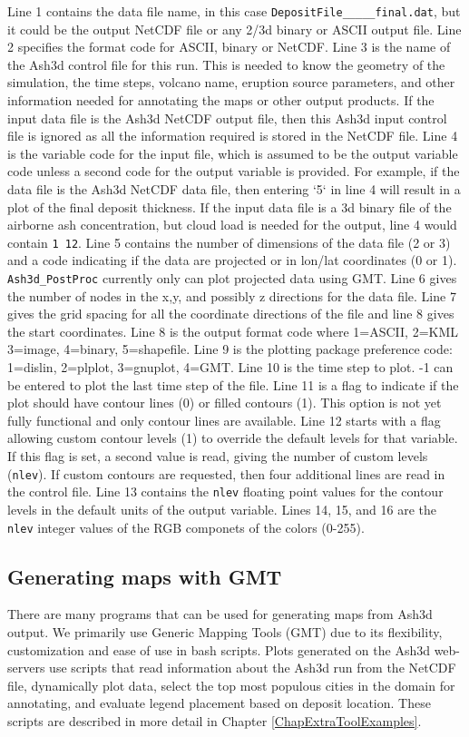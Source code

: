 Line 1 contains the data file name, in this case
\texttt{DepositFile\_\_\_\_\_final.dat}, but it could be
the output NetCDF file or any 2/3d binary or ASCII output file.
Line 2 specifies the format code for ASCII, binary or NetCDF.
Line 3 is the name of the Ash3d control file for this run. This is needed to know the geometry
of the simulation, the time steps, volcano name, eruption source parameters, and
other information needed for annotating the maps or other output products. If the
input data file is the Ash3d NetCDF output file, then this Ash3d input control file
is ignored as all the information required is stored in the NetCDF file.
Line 4 is the variable code for the input file, which is assumed to be the output
variable code unless a second code for the output variable is provided. For example, if
the data file is the Ash3d NetCDF data file, then entering `5` in line 4 will result
in a plot of the final deposit thickness. If the input data file is a 3d binary
file of the airborne ash concentration, but cloud load is needed for the output, line
4 would contain \texttt{1 12}.
Line 5 contains the number of dimensions of the data file (2 or 3) and a code indicating if
the data are projected or in lon/lat coordinates (0 or 1). \texttt{Ash3d\_PostProc} currently
only can plot projected data using GMT.
Line 6 gives the number of nodes in the x,y, and possibly z directions for the data file.
Line 7 gives the grid spacing for all the coordinate directions of the file and line 8
gives the start coordinates.
Line 8 is the output format code where 1=ASCII, 2=KML 3=image, 4=binary, 5=shapefile.
Line 9 is the plotting package preference code: 1=dislin, 2=plplot, 3=gnuplot, 4=GMT.
Line 10 is the time step to plot. -1 can be entered to plot the last time step of the
file.
Line 11 is a flag to indicate if the plot should have contour lines (0) or filled contours (1).
This option is not yet fully functional and only contour lines are available.
Line 12 starts with a flag allowing custom contour levels (1) to override the default
levels for that variable. If this flag is set, a second value is read, giving the
number of custom levels (\texttt{nlev}).
If custom contours are requested, then four additional lines are read in the control file.
Line 13 contains the \texttt{nlev} floating point values for the contour levels in the
default units of the output variable.
Lines 14, 15, and 16 are the \texttt{nlev} integer values of the RGB componets of the colors (0-255).

\subsection{Generating maps with GMT}\label{ChapUsageSecPostProcGMT}
There are many programs that can be used for generating maps from Ash3d output. We primarily
use Generic Mapping Tools (GMT) due to its flexibility, customization and ease of use in
bash scripts. Plots generated on the Ash3d web-servers use scripts that read information
about the Ash3d run from the NetCDF file, dynamically plot data, select the top most populous
cities in the domain for annotating, and evaluate legend placement based on deposit location.
These scripts are described in more detail in Chapter \ref{ChapExtraToolExamples}.

